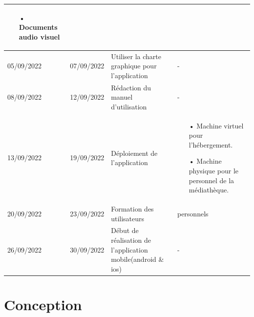 \documentclass[12pt,a4paper]{article}
\begin{document}
\begin{center}
\begin{tabular}{|p{2.2cm}|p{2.2cm}|p{6.5cm}|p{6.5cm}|}
\begin{itemize}
\item[•] Documents audio visuel
\end{itemize} \\
\hline 
05/09/2022 & 07/09/2022 & Utiliser la charte graphique pour l'application & - \\
\hline 
08/09/2022 & 12/09/2022 & Rédaction du manuel d'utilisation & - \\ 
\hline 
13/09/2022 & 19/09/2022 & Déploiement de l'application & 
\begin{itemize}
\item[•] Machine virtuel pour l'hébergement.
\item[•] Machine physique pour le personnel de la médiathèque.
\end{itemize} \\ 
\hline
20/09/2022 & 23/09/2022 & Formation des utilisateurs & personnels\\ 
\hline  
26/09/2022 & 30/09/2022 & Début de réalisation de l'application mobile(android \& ios) & -\\ 
\hline 
\end{tabular} 
\end{center}

\section{Conception}
\end{document}

